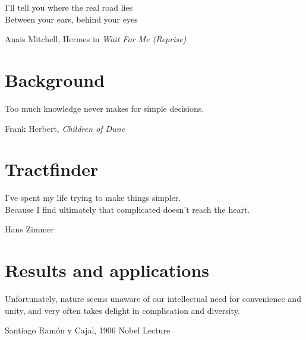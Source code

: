 \documentclass[12pt,phd,a4paper,oneside,draft]{ucl_thesis}
\begin{document}


\ifdraft{%
  \setcounter{tocdepth}{5}
  \tableofcontents
  \renewcommand{\part}[1]{}}{%
  
  \printglossary[type=\acronymtype]
  \glsaddallunused[main]
  \printglossary
}

\epigraph{I'll tell you where the real road lies\\
Between your ears, behind your eyes}{Anais Mitchell, Hermes in \textit{Wait For Me (Reprise)}}


\part{Background}
\epigraph{Too much knowledge never makes for simple decisions.}{Frank Herbert, \textit{Children of Dune}}





\part{Tractfinder}
\epigraph{I've spent my life trying to make things simpler. \\ Because I find ultimately that complicated doesn't reach the heart.}{Hans Zimmer}








\part{Results and applications}
\epigraph{Unfortunately, nature seems unaware of our intellectual need for convenience and unity, and very often takes delight in complication and diversity.}{Santiago Ramón y Cajal, 1906 Nobel Lecture}




\end{document}
